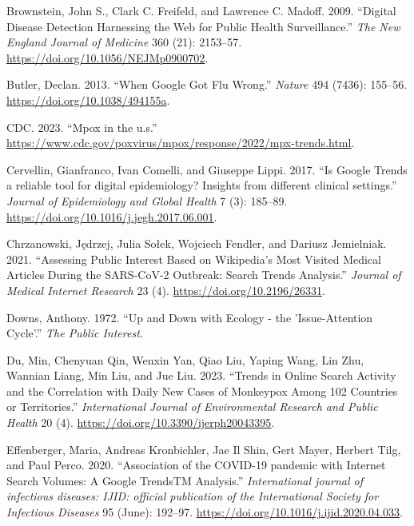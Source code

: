 \documentclass[
  12pt,
]{article}
\newlength{\cslhangindent}
\newenvironment{CSLReferences}[2] %
 {\begin{list}{}{%
  \setlength{\itemindent}{0pt}
  \setlength{\leftmargin}{0pt}
  \setlength{\parsep}{0pt}
  \ifodd #1
   \setlength{\leftmargin}{\cslhangindent}
   \setlength{\itemindent}{-1\cslhangindent}
  \fi
  \setlength{\itemsep}{#2\baselineskip}}}
 {\end{list}}
\begin{document}
\begin{CSLReferences}{1}{0}
Brownstein, John S., Clark C. Freifeld, and Lawrence C. Madoff. 2009.
{``Digital Disease Detection {\textemdash} Harnessing the Web for Public
Health Surveillance.''} \emph{The New England Journal of Medicine} 360
(21): 2153--57. \url{https://doi.org/10.1056/NEJMp0900702}.

Butler, Declan. 2013. {``When Google Got Flu Wrong.''} \emph{Nature} 494
(7436): 155--56. \url{https://doi.org/10.1038/494155a}.

CDC. 2023. {``Mpox in the u.s.''}
\url{https://www.cdc.gov/poxvirus/mpox/response/2022/mpx-trends.html}.

Cervellin, Gianfranco, Ivan Comelli, and Giuseppe Lippi. 2017. {``Is
Google Trends a reliable tool for digital epidemiology? Insights from
different clinical settings.''} \emph{Journal of Epidemiology and Global
Health} 7 (3): 185--89.
\url{https://doi.org/10.1016/j.jegh.2017.06.001}.

Chrzanowski, Jędrzej, Julia Sołek, Wojciech Fendler, and Dariusz
Jemielniak. 2021. {``Assessing Public Interest Based on Wikipedia{'}s
Most Visited Medical Articles During the SARS-CoV-2 Outbreak: Search
Trends Analysis.''} \emph{Journal of Medical Internet Research} 23 (4).
\url{https://doi.org/10.2196/26331}.

Downs, Anthony. 1972. {``Up and Down with Ecology - the 'Issue-Attention
Cycle'.''} \emph{The Public Interest}.

Du, Min, Chenyuan Qin, Wenxin Yan, Qiao Liu, Yaping Wang, Lin Zhu,
Wannian Liang, Min Liu, and Jue Liu. 2023. {``Trends in Online Search
Activity and the Correlation with Daily New Cases of Monkeypox Among 102
Countries or Territories.''} \emph{International Journal of
Environmental Research and Public Health} 20 (4).
\url{https://doi.org/10.3390/ijerph20043395}.

Effenberger, Maria, Andreas Kronbichler, Jae Il Shin, Gert Mayer,
Herbert Tilg, and Paul Perco. 2020. {``Association of the COVID-19
pandemic with Internet Search Volumes: A Google TrendsTM Analysis.''}
\emph{International journal of infectious diseases: IJID: official
publication of the International Society for Infectious Diseases} 95
(June): 192--97. \url{https://doi.org/10.1016/j.ijid.2020.04.033}.


\end{CSLReferences}
\end{document}
